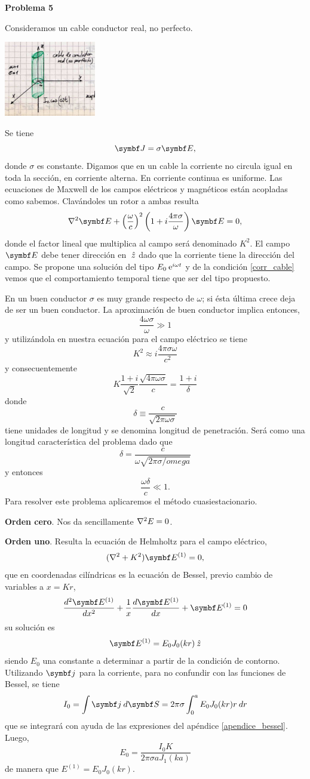 \documentclass[10pt,oneside]{CBFT_book}
\begin{document}
\begin{ejemplo}{\bf Problema 5}

Consideramos un cable conductor real, no perfecto.

\includegraphics[width=0.3\textwidth]{images/fig_ft1_problema5_cuasiestac.jpg}

Se tiene 
\[
	\vb{J} = \sigma \vb{E},
	\label{corr_cable}
\]
donde $\sigma$ es constante. Digamos que en un cable la corriente
no circula igual en toda la sección, en corriente alterna. En corriente continua es uniforme.
Las ecuaciones de Maxwell de los campos eléctricos y magnéticos están acopladas como sabemos.
Clavándoles un rotor a ambas resulta
\[
	\nabla^2 \vb{E} + \Frac{\omega}{c}^2 \left( 1 + i \frac{4\pi\sigma}{\omega} \right) \vb{E} = 0,
\]
donde el factor lineal que multiplica al campo será denominado $K^2$. El campo $\vb E$ debe tener 
dirección en $\:\hat{z}$ dado que la corriente tiene la dirección del campo. Se propone una solución
del tipo $ E_0 \:\mathrm{e}^{i \omega t}$ y de la condición \eqref{corr_cable} vemos que el comportamiento
temporal tiene que ser del tipo propuesto.

En un buen conductor $\sigma$ es muy grande respecto de $\omega$; si ésta última crece deja de
ser un buen conductor. La aproximación de buen conductor implica entonces,
\[
	\frac{4 \omega \sigma }{\omega} \gg 1
\]
y utilizándola en nuestra ecuación para el campo eléctrico se tiene
\[
	K^2 \approx  i \frac{4\pi\sigma\omega}{c^2}
\]
y consecuentemente
\[
	K \frac{1+i}{\sqrt{2}} \frac{\sqrt{4 \pi \omega \sigma}}{c} = \frac{1+i}{\delta}
\]
donde 
\[
	\delta \equiv \frac{c}{\sqrt{2 \pi \omega \sigma}}
\]
tiene unidades de longitud y se denomina longitud de penetración. Será como una longitud
característica del problema dado que 
\[
	\delta = \frac{c}{\omega \sqrt{2 \pi \sigma / omega }}
\]
y entonces
\[
	\frac{\omega \delta }{c} \ll 1.
\]
Para resolver este problema aplicaremos el método cuasiestacionario.

{\bf Orden cero}.
Nos da sencillamente $\nabla^2{E}=0$.

{\bf Orden uno}.
Resulta la ecuación de Helmholtz para el campo eléctrico,
\[
	(\nabla^2+K^2 )\vb{E}^{(1)} = 0,
\]
que en coordenadas cilíndricas es la ecuación de Bessel, previo cambio de
variables a $x = Kr$,
\[
	\dtot[2]{\vb{E}^{(1)}}{x} + 
	\frac{1}{x}\dtot{\vb{E}^{(1)}}{x} + \vb{E}^{(1)} = 0
\]
su solución es 
\[
	\vb{E}^{(1)} = E_0 J_0(kr) \zver
\]
siendo $E_0$ una constante a determinar a partir de la condición de contorno.
Utilizando $\vb j$ para la corriente, para no confundir con las funciones de Bessel,
se tiene
\[
	I_0 = \int \vb j \: d\vb{S} = 
	2 \pi \sigma \int_0^a E_0 J_0(kr) r \: dr
\]
que se integrará con ayuda de las expresiones del apéndice \ref{apendice_bessel}.
Luego,
\[
	E_0 = \frac{I_0 K}{2 \pi \sigma a J_1(ka)}
\]
de manera que $E^{(1)} = E_0 J_0(kr)$.


\end{ejemplo}
\end{document}
